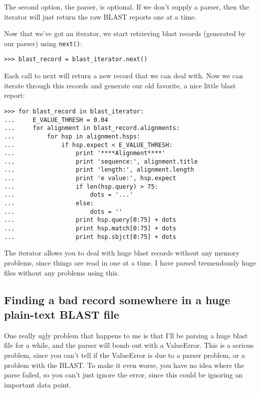 \documentclass{report}
\begin{document}
The second option, the parser, is optional. If we don't supply a parser, then the iterator will just return the raw BLAST reports one at a time.

Now that we've got an iterator, we start retrieving blast records (generated by our parser) using \verb|next()|:

\begin{verbatim}
>>> blast_record = blast_iterator.next()
\end{verbatim}

Each call to next will return a new record that we can deal with. Now we can iterate through this records and generate our old favorite, a nice little blast report:

\begin{verbatim}
>>> for blast_record in blast_iterator:
...     E_VALUE_THRESH = 0.04
...     for alignment in blast_record.alignments:
...         for hsp in alignment.hsps:
...             if hsp.expect < E_VALUE_THRESH:
...                 print '****Alignment****'
...                 print 'sequence:', alignment.title
...                 print 'length:', alignment.length
...                 print 'e value:', hsp.expect
...                 if len(hsp.query) > 75:
...                     dots = '...'
...                 else:
...                     dots = ''
...                 print hsp.query[0:75] + dots
...                 print hsp.match[0:75] + dots
...                 print hsp.sbjct[0:75] + dots
\end{verbatim}


The iterator allows you to deal with huge blast records without any memory problems, since things are read in one at a time. I have parsed tremendously huge files without any problems using this.

\subsection{Finding a bad record somewhere in a huge plain-text BLAST file}

One really ugly problem that happens to me is that I'll be parsing a huge blast file for a while, and the parser will bomb out with a ValueError. This is a serious problem, since you can't tell if the ValueError is due to a parser problem, or a problem with the BLAST. To make it even worse, you have no idea where the parse failed, so you can't just ignore the error, since this could be ignoring an important data point.
\end{document}
